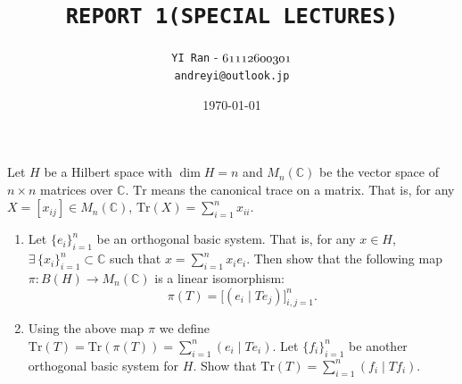 \documentclass[dvipdfmx,a4paper]{jsarticle}
\title{\vspace{-3cm} \textbf{\texttt{REPORT 1(SPECIAL LECTURES)}}}
\author{\texttt{YI Ran} - $\mathnormal{61112600301}$\\ \texttt{andreyi@outlook.jp}}
\date{\today}
\theoremstyle{mystyle}
\begin{document}
\maketitle
\thispagestyle{plain}




\section*{}

\textrm{Let $H$ be a Hilbert space with $\dim H = n$ and $M_n(\mathbb{C})$ be the vector space
of $n \times n$ matrices over $\mathbb{C}$.
$\mathrm{Tr}$ means the canonical trace on a matrix.
That is, for any $X = [x_{ij}] \in M_n(\mathbb{C})$,
$\mathrm{Tr}(X) = \sum_{i=1}^{n} x_{ii}$.}

\begin{enumerate}[(1)]
  \item \textrm{Let $\{e_i\}_{i=1}^{n}$ be an orthogonal basic system.
  That is, for any $x \in H$, $\exists\, \{x_i\}_{i=1}^{n} \subset \mathbb{C}$ such that
  $x = \sum_{i=1}^{n} x_i e_i$.
  Then show that the following map $\pi : B(H) \to M_n(\mathbb{C})$ is a linear isomorphism:
  \[
    \pi(T) = \bigl[(e_i \mid T e_j)\bigr]_{i,j=1}^{n}.
  \]}

  \item \textrm{Using the above map $\pi$ we define
  $\mathrm{Tr}(T) = \mathrm{Tr}(\pi(T)) = \sum_{i=1}^{n}(e_i \mid Te_i)$.
  Let $\{f_i\}_{i=1}^{n}$ be another orthogonal basic system for $H$.
  Show that $\mathrm{Tr}(T) = \sum_{i=1}^{n}(f_i \mid Tf_i)$.}
\end{enumerate}
\end{document}
